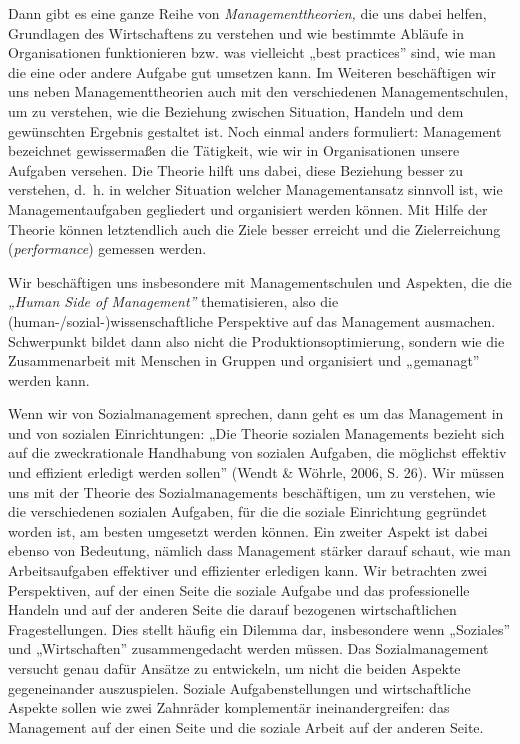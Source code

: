 \documentclass[
  letterpaper,
]{book}
\begin{document}
Dann gibt es eine ganze Reihe von \emph{Managementtheorien,} die uns
dabei helfen, Grundlagen des Wirtschaftens zu verstehen und wie
bestimmte Abläufe in Organisationen funktionieren bzw. was vielleicht
„best practices'' sind, wie man die eine oder andere Aufgabe gut
umsetzen kann. Im Weiteren beschäftigen wir uns neben Managementtheorien
auch mit den verschiedenen Managementschulen, um zu verstehen, wie die
Beziehung zwischen Situation, Handeln und dem gewünschten Ergebnis
gestaltet ist. Noch einmal anders formuliert: Management bezeichnet
gewissermaßen die Tätigkeit, wie wir in Organisationen unsere Aufgaben
versehen. Die Theorie hilft uns dabei, diese Beziehung besser zu
verstehen, d.~h. in welcher Situation welcher Managementansatz sinnvoll
ist, wie Managementaufgaben gegliedert und organisiert werden können.
Mit Hilfe der Theorie können letztendlich auch die Ziele besser erreicht
und die Zielerreichung (\emph{performance}) gemessen werden.

Wir beschäftigen uns insbesondere mit Managementschulen und Aspekten,
die die \emph{„Human Side of Management''} thematisieren, also die
(human-/sozial-)wissenschaftliche Perspektive auf das Management
ausmachen. Schwerpunkt bildet dann also nicht die
Produktionsoptimierung, sondern wie die Zusammenarbeit mit Menschen in
Gruppen und organisiert und „gemanagt'' werden kann.

Wenn wir von Sozialmanagement sprechen, dann geht es um das Management
in und von sozialen Einrichtungen: „Die Theorie sozialen Managements
bezieht sich auf die zweckrationale Handhabung von sozialen Aufgaben,
die möglichst effektiv und effizient erledigt werden sollen'' (Wendt \&
Wöhrle, 2006, S. 26). Wir müssen uns mit der Theorie des
Sozialmanagements beschäftigen, um zu verstehen, wie die verschiedenen
sozialen Aufgaben, für die die soziale Einrichtung gegründet worden ist,
am besten umgesetzt werden können. Ein zweiter Aspekt ist dabei ebenso
von Bedeutung, nämlich dass Management stärker darauf schaut, wie man
Arbeitsaufgaben effektiver und effizienter erledigen kann. Wir
betrachten zwei Perspektiven, auf der einen Seite die soziale Aufgabe
und das professionelle Handeln und auf der anderen Seite die darauf
bezogenen wirtschaftlichen Fragestellungen. Dies stellt häufig ein
Dilemma dar, insbesondere wenn „Soziales'' und „Wirtschaften''
zusammengedacht werden müssen. Das Sozialmanagement versucht genau dafür
Ansätze zu entwickeln, um nicht die beiden Aspekte gegeneinander
auszuspielen. Soziale Aufgabenstellungen und wirtschaftliche Aspekte
sollen wie zwei Zahnräder komplementär ineinandergreifen: das Management
auf der einen Seite und die soziale Arbeit auf der anderen Seite.
\end{document}
